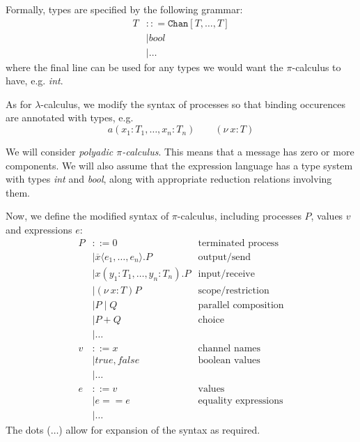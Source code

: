 \documentclass[a4paper, openany]{memoir}
\theoremstyle{definition}
\begin{document}
    Formally, types are specified by the following grammar:
    \begin{align*}
        T &:: = \texttt{Chan}[T, \dots, T] \\
        &\mid \textit{bool} \\
        &\mid \dots
    \end{align*}
    where the final line can be used for any types we would want the $\pi$-calculus to have, e.g. \textit{int}.

    As for $\lambda$-calculus, we modify the syntax of processes so that binding occurences are annotated with types, e.g.
    \[a(x_1 \colon T_1, \dots, x_n \colon T_n) \qquad (\nu \ x \colon T)\]
    
    We will consider \emph{polyadic $\pi$-calculus}. This means that a message has zero or more components. We will also assume that the expression language has a type system with types \textit{int} and \textit{bool}, along with appropriate reduction relations involving them.

    Now, we define the modified syntax of $\pi$-calculus, including processes $P$, values $v$ and expressions $e$:
    \begin{align*}
        P &::= 0  & \textrm{terminated process} \\
        &\mid \overline{x} \langle e_1, \dots, e_n \rangle.P & \textrm{output/send} \\
        &\mid x(y_1 \colon T_1, \dots, y_n \colon T_n).P & \textrm{input/receive} \\
        &\mid (\nu  \ x \colon T)P & \textrm{scope/restriction} \\
        &\mid P \mid Q & \textrm{parallel composition} \\
        &\mid P + Q & \textrm{choice} \\
        &\mid \dots \\
        v &::= x & \textrm{channel names} \\
        &\mid \textit{true}, \textit{false} & \textrm{boolean values} \\
        &\mid \dots \\
        e &::= v & \textrm{values} \\
        &\mid e == e & \textrm{equality expressions} \\
        &\mid \dots
    \end{align*}
    The dots ($\dots$) allow for expansion of the syntax as required.
\end{document}
